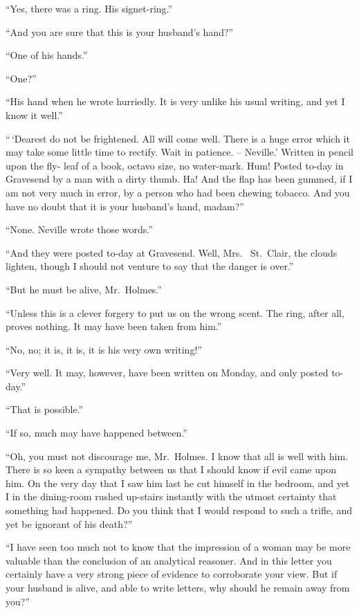 “Yes, there was a ring. His signet-ring.”

“And you are sure that this is your husband’s hand?”

“One of his hands.”

“One?”

“His hand when he wrote hurriedly. It is very unlike his
usual writing, and yet I know it well.”

“\,‘Dearest do not be frightened. All will come well. There
is a huge error which it may take some little time to rectify.
Wait in patience. -- Neville.’ Written in pencil upon the fly-%
leaf of a book, octavo size, no water-mark. Hum! Posted
to-day in Gravesend by a man with a dirty thumb. Ha!
And the flap has been gummed, if I am not very much
in error, by a person who had been chewing tobacco.
And you have no doubt that it is your husband’s hand,
madam?”

“None. Neville wrote those words.”

“And they were posted to-day at Gravesend. Well, Mrs.\ %
St.~Clair, the clouds lighten, though I should not venture to
say that the danger is over.”

“But he must be alive, Mr.~Holmes.”

“Unless this is a clever forgery to put us on the wrong
scent. The ring, after all, proves nothing. It may have been
taken from him.”

“No, no; it is, it is, it is his very own writing!”

“Very well. It may, however, have been written on Monday,
and only posted to-day.”

“That is possible.”

“If so, much may have happened between.”

“Oh, you must not discourage me, Mr.~Holmes. I know
that all is well with him. There is so keen a sympathy between
us that I should know if evil came upon him. On the
very day that I saw him last he cut himself in the bedroom,
and yet I in the dining-room rushed up-stairs instantly with
the utmost certainty that something had happened. Do you
think that I would respond to such a trifle, and yet be ignorant
of his death?”

“I have seen too much not to know that the impression of
a woman may be more valuable than the conclusion of an analytical
reasoner. And in this letter you certainly have a very
strong piece of evidence to corroborate your view. But if
your husband is alive, and able to write letters, why should he
remain away from you?”

